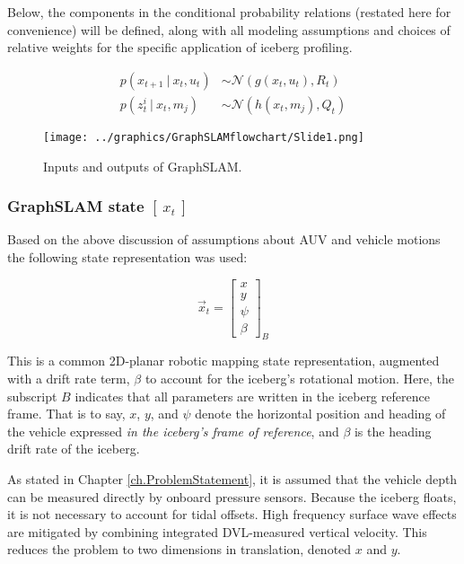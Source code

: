 Below, the components in the conditional probability relations (restated here for convenience) will be defined, along with all modeling assumptions and choices of relative weights for the specific application of iceberg profiling. 

\begin{align}
p\left(x_{t+1}~|~x_t,u_t\right) & \sim \mathcal{N}\left(g(x_t,u_t), R_t\right) \\
p\left(z^i_{t}~|~x_t,m_j\right) & \sim \mathcal{N}\left(h(x_t,m_j), Q_t\right)
\end{align}

\begin{figure}[htb]
   \centering
   \texttt{[image: ../graphics/GraphSLAMflowchart/Slide1.png]} %
   \caption{Inputs and outputs of GraphSLAM.}
   \label{fig:GraphSLAMIO}
\end{figure}

\subsubsection{GraphSLAM state $\left[~x_t~\right]$}

Based on the above discussion of assumptions about AUV and vehicle motions the following state representation was used:

\begin{equation}
\label{eq.state}
\vec{x}_t= \left[\begin{array}{c}
                     x \\ y \\ \psi \\ \beta 
                     \end{array}\right]_B
\end{equation}

This is a common 2D-planar robotic mapping state representation, augmented with a drift rate term, $\beta$ to account for the iceberg's rotational motion. Here, the subscript $B$ indicates that all parameters are written in the iceberg reference frame. That is to say, $x$, $y$, and $\psi$ denote the horizontal position and heading of the vehicle expressed \emph{in the iceberg's frame of reference}, and $\beta$ is the heading drift rate of the iceberg. 

As stated in Chapter \ref{ch.ProblemStatement}, it is assumed that the vehicle depth can be measured directly by onboard pressure sensors. Because the iceberg floats, it is not necessary to account for tidal offsets. High frequency surface wave effects are mitigated by combining integrated DVL-measured vertical velocity. This reduces the problem to two dimensions in translation, denoted $x$ and $y$. 

